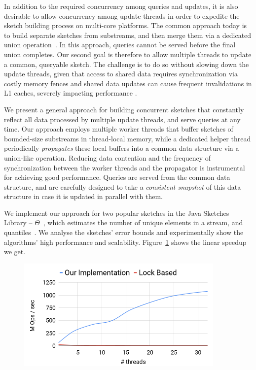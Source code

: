 In addition to the required concurrency among queries and updates,
it is also desirable to allow
concurrency among update threads in order to expedite the sketch building process on multi-core platforms. 
The common approach today is to build separate sketches from substreams, 
and then merge them via a dedicated union operation~\cite{multi-KMV}. 
In this approach, queries cannot be served before the final union completes. 
Our second goal is therefore to allow multiple threads to update a common, 
queryable sketch. The challenge is to do so without slowing down the update threads,
given that access to shared data requires  synchronization via costly memory fences 
and shared data updates can cause frequent invalidations in L1 caches, severely impacting performance
. 


We present a general approach for building concurrent sketches that
constantly reflect all data processed by multiple update threads, 
and serve queries at any time. %
Our  approach employs multiple worker threads that buffer sketches of bounded-size substreams in thread-local memory, while a dedicated helper thread 
periodically \emph{propagates} these local buffers into a common data structure via a union-like operation.
 Reducing data contention and the frequency of synchronization between the worker threads and the propagator is instrumental for achieving good performance. Queries are served from the common data structure, and are carefully 
 designed to take a \emph{consistent snapshot} of this data structure in case it is updated in parallel with them.

We implement our approach for two popular sketches in the Java Sketches Library -- $\Theta$~\cite{Theta},
which estimates the number of unique elements in a stream, and quantiles~\cite{quantiles}.
We analyse the sketches' error bounds
and experimentally show the algorithms' high performance and scalability. Figure~\ref{fig:thetaGraph}
shows the linear speedup we get.
  
\begin{figure}[h]
    \centering
    \includegraphics*[width=4in]{images/concurrentThetaGraph}
    \caption{}
     \label{fig:thetaGraph}
  \end{figure}


